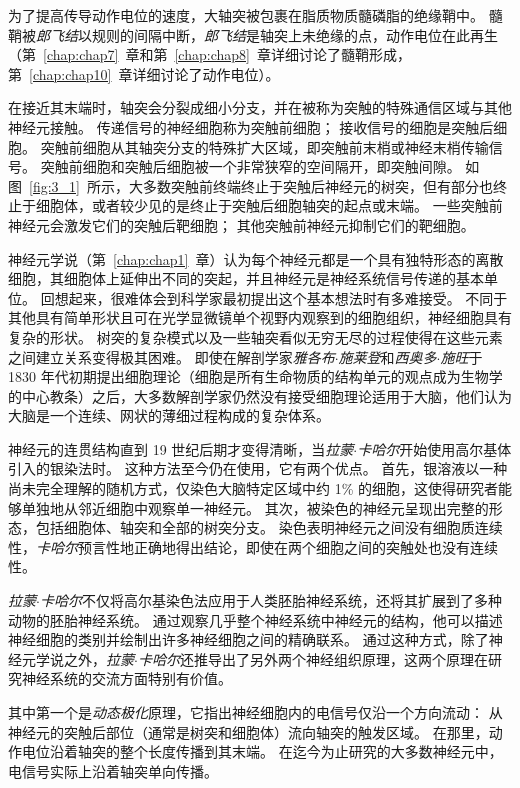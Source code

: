 为了提高传导动作电位的速度，大轴突被包裹在脂质物质髓磷脂的绝缘鞘中。
髓鞘被\textit{郎飞结}以规则的间隔中断，\textit{郎飞结}是轴突上未绝缘的点，动作电位在此再生（第~\ref{chap:chap7}~章和第~\ref{chap:chap8}~章详细讨论了髓鞘形成，第~\ref{chap:chap10}~章详细讨论了动作电位）。


在接近其末端时，轴突会分裂成细小分支，并在被称为突触的特殊通信区域与其他神经元接触。
传递信号的神经细胞称为突触前细胞；
接收信号的细胞是突触后细胞。
突触前细胞从其轴突分支的特殊扩大区域，即突触前末梢或神经末梢传输信号。
突触前细胞和突触后细胞被一个非常狭窄的空间隔开，即突触间隙。
如图~\ref{fig:3_1}~所示，大多数突触前终端终止于突触后神经元的树突，但有部分也终止于细胞体，或者较少见的是终止于突触后细胞轴突的起点或末端。 
一些突触前神经元会激发它们的突触后靶细胞；
其他突触前神经元抑制它们的靶细胞。


神经元学说（第~\ref{chap:chap1}~章）认为每个神经元都是一个具有独特形态的离散细胞，其细胞体上延伸出不同的突起，并且神经元是神经系统信号传递的基本单位。
回想起来，很难体会到科学家最初提出这个基本想法时有多难接受。
不同于其他具有简单形状且可在光学显微镜单个视野内观察到的细胞组织，神经细胞具有复杂的形状。
树突的复杂模式以及一些轴突看似无穷无尽的过程使得在这些元素之间建立关系变得极其困难。
即使在解剖学家\textit{雅各布$\cdot$施莱登}和\textit{西奥多$\cdot$施旺}于 1830 年代初期提出细胞理论（细胞是所有生命物质的结构单元的观点成为生物学的中心教条）之后，大多数解剖学家仍然没有接受细胞理论适用于大脑，他们认为大脑是一个连续、网状的薄细过程构成的复杂体系。


神经元的连贯结构直到 19 世纪后期才变得清晰，当\textit{拉蒙$\cdot$卡哈尔}开始使用高尔基体引入的银染法时。
这种方法至今仍在使用，它有两个优点。
首先，银溶液以一种尚未完全理解的随机方式，仅染色大脑特定区域中约 1\% 的细胞，这使得研究者能够单独地从邻近细胞中观察单一神经元。
其次，被染色的神经元呈现出完整的形态，包括细胞体、轴突和全部的树突分支。
染色表明神经元之间没有细胞质连续性，\textit{卡哈尔}预言性地正确地得出结论，即使在两个细胞之间的突触处也没有连续性。


\textit{拉蒙$\cdot$卡哈尔}不仅将高尔基染色法应用于人类胚胎神经系统，还将其扩展到了多种动物的胚胎神经系统。 
通过观察几乎整个神经系统中神经元的结构，他可以描述神经细胞的类别并绘制出许多神经细胞之间的精确联系。
通过这种方式，除了神经元学说之外，\textit{拉蒙$\cdot$卡哈尔}还推导出了另外两个神经组织原理，这两个原理在研究神经系统的交流方面特别有价值。


其中第一个是\textit{动态极化}原理，它指出神经细胞内的电信号仅沿一个方向流动：
从神经元的突触后部位（通常是树突和细胞体）流向轴突的触发区域。
在那里，动作电位沿着轴突的整个长度传播到其末端。
在迄今为止研究的大多数神经元中，电信号实际上沿着轴突单向传播。


